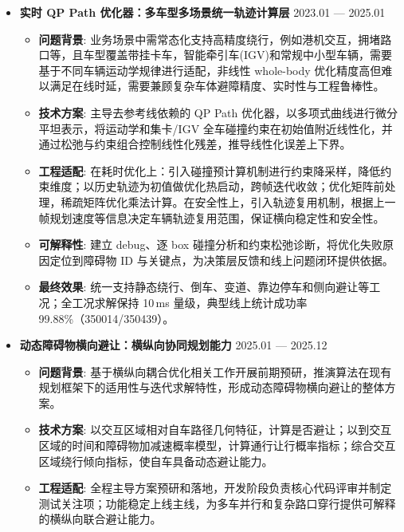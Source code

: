 \documentclass[zh]{resume}
\begin{document}
\begin{itemize}
  \item \textbf{实时 QP Path 优化器：多车型多场景统一轨迹计算层} \hfill 2023.01 --- 2025.01
  \begin{itemize}
    \item \textbf{问题背景}: 业务场景中需常态化支持高精度绕行，例如港机交互，拥堵路口等，且车型覆盖带挂卡车，智能牵引车(IGV)和常规中小型车辆，需要基于不同车辆运动学规律进行适配，非线性 whole-body 优化精度高但难以满足在线时延，需要兼顾复杂车体避障精度、实时性与工程鲁棒性。
    \item \textbf{技术方案}: 主导去参考线依赖的 QP Path 优化器，以多项式曲线进行微分平坦表示，将运动学和集卡/IGV 全车碰撞约束在初始值附近线性化，并通过松弛与约束组合控制线性化残差，推导线性化误差上下界。
    \item \textbf{工程适配}: 在耗时优化上：引入碰撞预计算机制进行约束降采样，降低约束维度；以历史轨迹为初值做优化热启动，跨帧迭代收敛；优化矩阵前处理，稀疏矩阵优化乘法计算。在安全性上，引入轨迹复用机制，根据上一帧规划速度等信息决定车辆轨迹复用范围，保证横向稳定性和安全性。
    \item \textbf{可解释性}: 建立 debug、逐 box 碰撞分析和约束松弛诊断，将优化失败原因定位到障碍物 ID 与关键点，为决策层反馈和线上问题闭环提供依据。
    \item \textbf{最终效果}: 统一支持静态绕行、倒车、变道、靠边停车和侧向避让等工况；全工况求解保持 10\,ms 量级，典型线上统计成功率 99.88\%（350014/350439）。
  \end{itemize}

  \item \textbf{动态障碍物横向避让：横纵向协同规划能力} \hfill 2025.01 --- 2025.12
  \begin{itemize}
    \item \textbf{问题背景}: 基于横纵向耦合优化相关工作开展前期预研，推演算法在现有规划框架下的适用性与迭代求解特性，形成动态障碍物横向避让的整体方案。
    \item \textbf{技术方案}: 以交互区域相对自车路径几何特征，计算是否避让；以到交互区域的时间和障碍物加减速概率模型，计算通行让行概率指标；综合交互区域绕行倾向指标，使自车具备动态避让能力。
    \item \textbf{工程适配}: 全程主导方案预研和落地，开发阶段负责核心代码评审并制定测试关注项；功能稳定上线主线，为多车并行和复杂路口穿行提供可解释的横纵向联合避让能力。
  \end{itemize}


\end{itemize}
\end{document}

